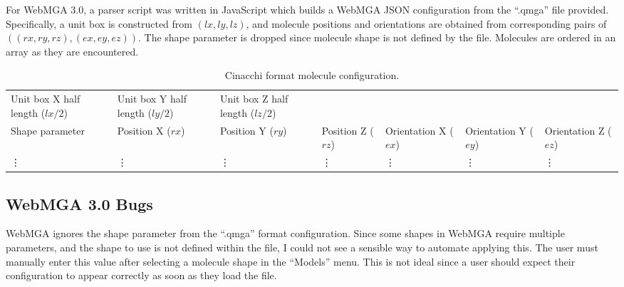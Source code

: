 For WebMGA 3.0, a parser script was written in JavaScript which builds a WebMGA JSON configuration from the ``.qmga'' file provided. Specifically, a unit box is constructed from $(lx, ly, lz)$, and molecule positions and orientations are obtained from corresponding pairs of $((rx,ry,rz),(ex,ey,ez))$. The shape parameter is dropped since molecule shape is not defined by the file. Molecules are ordered in an array as they are encountered.
\begin{table}
  \begin{center}
  \begin{adjustbox}{width=\textwidth}
    \begin{tabular}{lllllll}
      \hline\hline
       Unit box X half length ($lx/2$) & Unit box Y half length ($ly/2$) & Unit box Z half length ($lz/2$) & & & &\\
       Shape parameter & Position X ($rx$) & Position Y ($ry$) & Position Z ($rz$) & Orientation X ($ex$) & Orientation Y ($ey$) & Orientation Z ($ez$)\\
       \vdots & \vdots & \vdots & \vdots & \vdots & \vdots & \vdots \\
       \hline\hline
    \end{tabular}
  \end{adjustbox}
  \end{center}
  \caption{Cinacchi format molecule configuration.}
  \label{tab:cinacchi_format}
\end{table}

\subsection{WebMGA 3.0 Bugs}
WebMGA ignores the shape parameter from the ``.qmga'' format configuration. Since some shapes in WebMGA require multiple parameters, and the shape to use is not defined within the file, I could not see a sensible way to automate applying this. The user must manually enter this value after selecting a molecule shape in the ``Models'' menu. This is not ideal since a user should expect their configuration to appear correctly as soon as they load the file.
